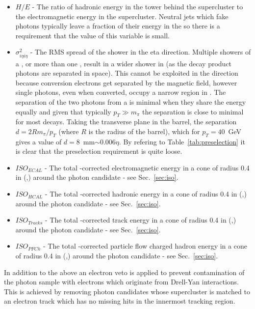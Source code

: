 \begin{itemize}
  \item $H/E$ - The ratio of hadronic energy in the \HCAL tower behind the supercluster to the electromagnetic energy in the supercluster. Neutral jets which fake photons typically leave a fraction of their energy in the \HCAL so there is a requirement that the value of this variable is small.
  \item $\sigma^{2}_{i\eta i\eta}$ - The RMS spread of the shower in the eta direction. Multiple showers of a \pizero, or more than one \pizero, result in a wider shower in \eta (as the \pizero decay product photons are separated in space). This cannot be exploited in the \phi direction because conversion electrons get separated by the magnetic field, however single photons, even when converted, occupy a narrow region in \eta. The separation of the two photons from a \pizero is minimal when they share the energy equally and given that typically $p_{T}\gg m_{\pi}$ the separation is close to minimal for most \pizero decays. Taking the transverse plane in the barrel, the separation $d=2Rm_{\pi}/p_{T}$ (where $R$ is the radius of the barrel), which for $p_{T}=40$~GeV gives a value of $d=$8~mm$\sim0.006\eta$. By refering to Table~\ref{tab:preselection} it is clear that the preselection requirement is quite loose.
  \item $ISO_{ECAL}$ - The total \rho-corrected electromagnetic energy in a cone of radius 0.4 in (\eta,\phi) around the photon candidate - see Sec.~\ref{sec:iso}.
  \item $ISO_{HCAL}$ - The total \rho-corrected hadronic energy in a cone of radius 0.4 in (\eta,\phi) around the photon candidate - see Sec.~\ref{sec:iso}.
  \item $ISO_{Tracks}$ - The total \rho-corrected track energy in a cone of radius 0.4 in (\eta,\phi) around the photon candidate - see Sec.~\ref{sec:iso}.
  \item $ISO_{PFCh}$ - The total \rho-corrected particle flow charged hadron energy in a cone of radius 0.4 in (\eta,\phi) around the photon candidate - see Sec.~\ref{sec:iso}.
\end{itemize}

In addition to the above an electron veto is applied to prevent contamination of the photon sample with electrons which originate from Drell-Yan interactions. This is achieved by removing photon candidates whose supercluster is matched to an electron track which has no missing hits in the innermost tracking region.

